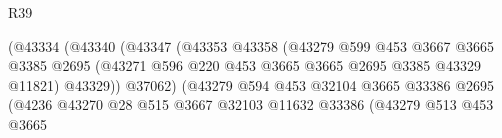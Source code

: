 \begin{lexlean}{R39}
\begin{coremodule}
                                              (@43334
                                                (@43340
                                                  (@43347
                                                    (@43353
                                                      @43358
                                                      (@43279
                                                        @599
                                                        @453
                                                        @3667
                                                        @3665
                                                        @3385
                                                        @2695
                                                        (@43271
                                                          @596
                                                          @220
                                                          @453
                                                          @3665
                                                          @3665
                                                          @2695
                                                          @3385
                                                          @43329
                                                          @11821)
                                                        @43329))
                                                    @37062)
                                                  (@43279
                                                    @594
                                                    @453
                                                    @32104
                                                    @3665
                                                    @33386
                                                    @2695
                                                    (@4236
                                                      @43270
                                                      @28
                                                      @515
                                                      @3667
                                                      @32103
                                                      @11632
                                                      @33386
                                                      (@43279
                                                        @513
                                                        @453
                                                        @3665

\end{coremodule}
\end{lexlean}
